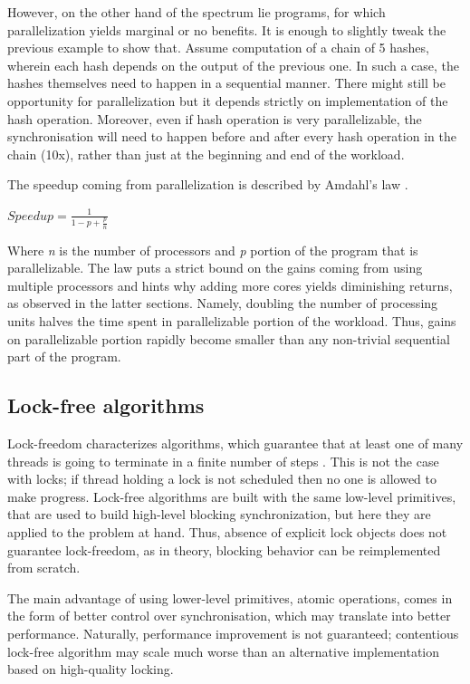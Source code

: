 \documentclass[12pt,a4paper,twoside]{report}
\begin{document}
However, on the other hand of the spectrum lie programs, for which parallelization yields marginal or no benefits. It is enough to slightly tweak the previous example to show that. Assume computation of a chain of 5 hashes, wherein each hash depends on the output of the previous one. In such a case, the hashes themselves need to happen in a sequential manner. There might still be opportunity for parallelization but it depends strictly on implementation of the hash operation. Moreover, even if hash operation is very parallelizable, the synchronisation will need to happen before and after every hash operation in the chain (10x), rather than just at the beginning and end of the workload. 


The speedup coming from parallelization is described by Amdahl's law \cite{art_of_mult}.

\begin{center}
$Speedup = \frac{1}{1 - p + \frac{p}{n}}$
\end{center} 

Where \textit{n} is the number of processors and \textit{p} portion of the program that is parallelizable. The law puts a strict bound on the gains coming from using multiple processors and hints why adding more cores yields diminishing returns, as observed in the latter sections. Namely, doubling the number of processing units halves the time spent in parallelizable portion of the workload. Thus, gains on parallelizable portion rapidly become smaller than any non-trivial sequential part of the program. 

\subsection{Lock-free algorithms}
Lock-freedom characterizes algorithms, which guarantee that at least one of many threads is going to terminate in a finite number of steps \cite{art_of_mult}. This is not the case with locks; if thread holding a lock is not scheduled then no one is allowed to make progress. Lock-free algorithms are built with the same low-level primitives, that are used to build high-level blocking synchronization, but here they are applied to the problem at hand. Thus, absence of explicit lock objects does not guarantee lock-freedom, as in theory, blocking behavior can be reimplemented from scratch. 

The main advantage of using lower-level primitives, atomic operations, comes in the form of better control over synchronisation, which may translate into better performance. Naturally, performance improvement is not guaranteed; contentious lock-free algorithm may scale much worse than an alternative implementation based on high-quality locking. 
\end{document}
